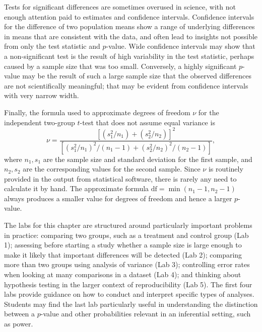 Tests for significant differences are sometimes overused in science, with not enough attention paid to estimates and confidence intervals.  Confidence intervals for the difference of two population means show a range of underlying differences in means that are consistent with the data, and often lead to insights not possible from only the test statistic and $p$-value.  Wide confidence intervals may show that a non-significant test is the result of high variability in the test statistic, perhaps caused by a sample size that was too small.  Conversely, a highly significant $p$-value may be the result of such a large sample size that the observed differences are not scientifically meaningful; that may be evident from confidence intervals with very narrow width.

\textD{\newpage}

Finally, the formula used to approximate degrees of freedom $\nu$ for the independent two-group $t$-test that does not assume equal variance is 
\[\nu = \dfrac{\left[(s_1^2/n_1) + (s_2^2/n_2)\right]^2}{\left[(s_1^2/n_1)^2/(n_1 - 1) + (s_2^2/n_2)^2/(n_2 - 1)\right]}, \]
where $n_1, s_1$ are the sample size and standard deviation for the first sample, and $n_2, s_2$ are the corresponding values for the second sample.
Since $\nu$ is routinely provided in the output from statistical software, there is rarely any need to calculate it by hand.  The approximate formula $\text{df} = \min(n_1 - 1, n_2 - 1)$ always produces a smaller value for degrees of freedom and hence a larger $p$-value.

The labs for this chapter are structured around particularly important problems in practice: comparing two groups, such as a treatment and control group (Lab 1);  assessing before starting a study whether a sample size is large enough to make it likely that important differences will be detected (Lab 2); comparing more than two groups using analysis of variance (Lab 3); controlling error rates when looking at many comparisons in a dataset (Lab 4); and thinking about hypothesis testing in the larger context of reproducibility (Lab 5). The first four labs provide guidance on how to conduct and interpret specific types of analyses.  Students may find the last lab particularly useful in understanding the distinction between a $p$-value and other probabilities relevant in an inferential setting, such as power.

